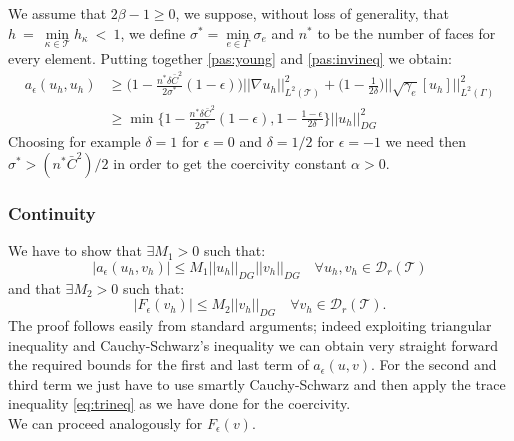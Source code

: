 \documentclass[12pt, a4paper]{article}
\theoremstyle{definition}
\theoremstyle{plain}
\theoremstyle{plain}
\theoremstyle{definition}
\begin{document}
We assume that $2\beta - 1 \geq 0$, we suppose, without loss of generality, 
that 
$h~=~\min\limits_{\kappa \in \mathcal{T}} h_\kappa~<~1$, we define $\sigma^* = 
\min\limits_{e \in \Gamma} \sigma_e$ and $n^*$ to be the number of faces for 
every element. Putting together \eqref{pas:young} and \eqref{pas:invineq} we 
obtain:
\begin{equation*}
\begin{split}
a_\epsilon(u_h, u_h) &\geq \big(1 - \frac{n^*\delta\bar{C}^2}{2\sigma^*} (1-\epsilon)\big) \big|\!\big| \nabla u_h \big|\!\big|^2_{L^2(\mathcal{T})}
+ \big(1 - \frac{1}{2\delta} \big) \bigg|\!\bigg| \sqrt{\gamma_e} [u_h] \bigg|\!\bigg|^2_{L^2(\Gamma)}\\
&\geq \min\bigg\{1 - \frac{n^*\delta\bar{C}^2}{2\sigma^*} (1-\epsilon) , 1 - \frac{1-\epsilon}{2\delta}\bigg\} |\!|u_h|\!|^2_{DG}
\end{split}
\end{equation*}
Choosing for example $\delta = 1$ for $\epsilon = 0$ and  $\delta = 1/2$ for 
$\epsilon = -1 $ we need then $\sigma^* > (n^*\bar{C}^2)/2$ in order to get the 
coercivity constant $\alpha > 0$.
\subsubsection{Continuity}
We have to show that $\exists M_1 > 0$ such that:
\begin{equation*}
	|a_\epsilon(u_h, v_h)| \leq M_1 |\!|u_h|\!|_{DG} |\!|v_h|\!|_{DG} \quad 
	\forall u_h, v_h \in \mathcal{D}_r(\mathcal{T})
\end{equation*}
and that $\exists M_2 > 0$ such that:
\begin{equation*}
	|F_\epsilon(v_h)| \leq M_2 |\!|v_h|\!|_{DG} \quad \forall v_h \in 
	\mathcal{D}_r(\mathcal{T}).
\end{equation*}
The proof follows easily from standard arguments; indeed exploiting triangular inequality and Cauchy-Schwarz's inequality we can obtain very straight forward the required bounds for the first and last term of $a_\epsilon(u, v)$. For the second and third term we just have to use smartly Cauchy-Schwarz and then apply the trace inequality \eqref{eq:trineq} as we have done for the coercivity.\\
We can proceed analogously for $F_\epsilon(v)$.
\newpage
\end{document}
